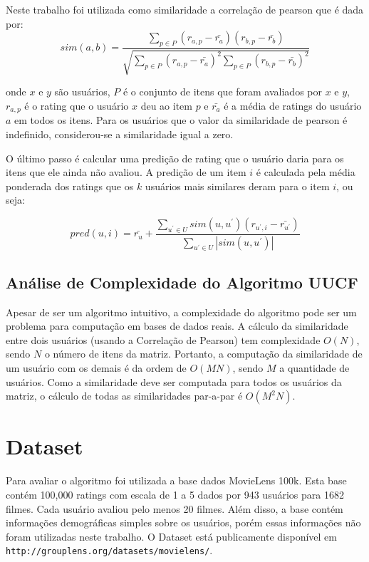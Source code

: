 \documentclass[12pt, a4paper, oneside]{article}
\begin{document}
Neste trabalho foi utilizada como similaridade a correlação de pearson que é dada por:
$$sim(a,b) = \frac{\sum\limits_{p \in P}(r_{a,p}-\bar{r_a})(r_{b,p}-\bar{r_b})}{\sqrt{\sum\limits_{p \in P}(r_{a,p}-\bar{r_a})^2\sum\limits_{p \in P}(r_{b,p}-\bar{r_b})^2}}$$

onde $x$ e $y$ são usuários, $P$ é o conjunto de itens que foram avaliados por $x$ e $y$, $r_{a,p}$ é o rating que o usuário $x$ deu ao item $p$ e $\bar{r_a}$ é a média de ratings do usuário $a$ em todos os itens.
Para os usuários que o valor da similaridade de pearson é indefinido, considerou-se a similaridade igual a zero.

O último passo é calcular uma predição de rating que o usuário daria para os itens que ele ainda não avaliou. A predição de um item $i$ é calculada pela média ponderada dos ratings que os $k$ usuários mais similares deram para o item $i$, ou seja:

$$ pred(u, i) = \bar{r_u} +  \frac{ \sum\limits_{u^\prime \in U} sim(u,u^\prime)(r_{u^\prime, i} - \bar{r_{u^\prime}}) }{ \sum_{u^\prime \in U} |sim(u,u^\prime)| } $$

\subsection{Análise de Complexidade do Algoritmo UUCF}

Apesar de ser um algoritmo intuitivo, a complexidade do algoritmo pode ser um problema para computação em bases de dados reais. A cálculo da similaridade entre dois usuários (usando a Correlação de Pearson) tem complexidade $O(N)$, sendo $N$ o número de itens da matriz. Portanto, a computação da similaridade de um usuário com os demais é da ordem de $O(MN)$, sendo $M$ a quantidade de usuários. Como a similaridade deve ser computada para todos os usuários da matriz, o cálculo de todas as similaridades par-a-par é $O(M^{2}N)$.


\section{Dataset}
\label{sec:dataset}
Para avaliar o algoritmo foi utilizada a base dados MovieLens 100k. Esta base contém 100,000 ratings
com escala de 1 a 5 dados por 943 usuários para 1682 filmes. Cada usuário avaliou pelo menos 20 filmes.
Além disso, a base contém informações demográficas simples sobre os usuários, porém essas informações 
não foram utilizadas neste trabalho. O Dataset está publicamente disponível em \texttt{http://grouplens.org/datasets/movielens/}.
\end{document}
